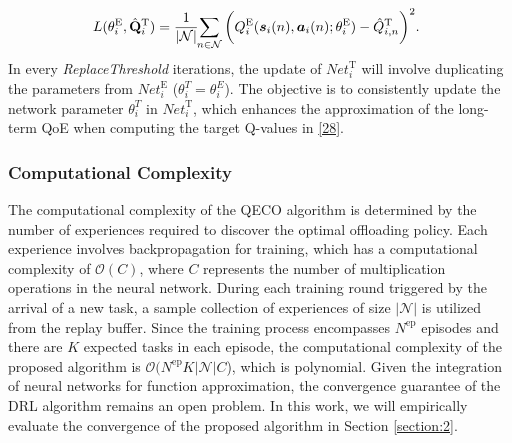 \documentclass[10pt, journal,letterpaper]{IEEEtran}
\begin{document}
\begin{alignat}{1}
	\hspace{-2mm}L(\theta_i^{\text{E}},\hat{\mathbf{Q}}_i^{\text{T}}) = {1 \over |\mathcal{N}| }\hspace{-1mm} \sum\limits_{n \in \mathcal{N}} \bigg(Q_i^{\text{E}}(\boldsymbol{s}_i(n) , \boldsymbol{a}_i(n); \theta_i^{\text{E}} ) -   \hat{Q}^{\text{T}}_{i,n}  \bigg)^2.
	\label{31}  
\end{alignat}  
In every \textit{ReplaceThreshold} iterations, the update of $\textit{Net}_i^{\text{T}}$ will involve duplicating the parameters from $\textit{Net}_i^{\text{E}}$ ($\theta_i^{T} = \theta_i^{E}$). The objective is to consistently update the network parameter $\theta_i^{T}$ in $\textit{Net}_i^{\text{T}}$, which enhances the approximation of the long-term QoE when computing the target Q-values in \eqref{28}.\\

\subsubsection{Computational Complexity}


The computational complexity of the QECO algorithm is determined by the number of experiences required to discover the optimal offloading policy. Each experience involves backpropagation for training, which has a computational complexity of $\mathcal{O}(C)$, where $C$ represents the number of multiplication operations in the neural network. During each training round triggered by the arrival of a new task, a sample collection of experiences of size $|\mathcal{N}|$ is utilized from the replay buffer. Since the training process encompasses $N^{\text{ep}}$ episodes and there are $K$ expected tasks in each episode, the computational complexity of the proposed algorithm is $\mathcal{O}(N^{\text{ep}}K|\mathcal{N}|C$), which is polynomial. Given the integration of neural networks for function approximation, the convergence guarantee of the DRL algorithm remains an open problem. In this work, we will empirically evaluate the convergence of the proposed algorithm in Section \ref{section:2}.

\end{document}
